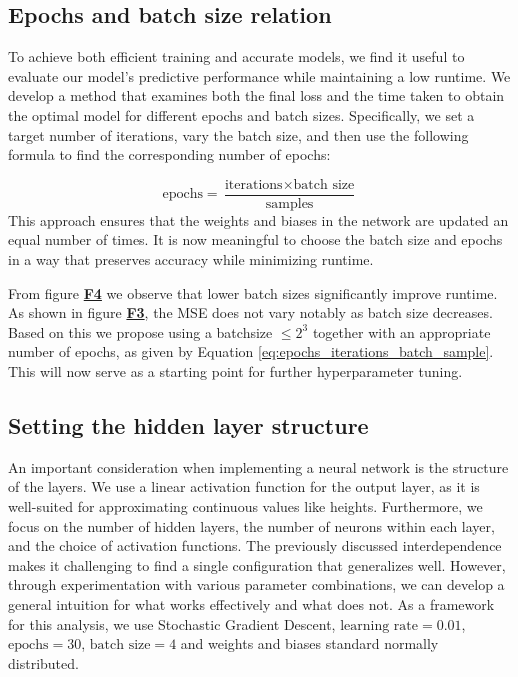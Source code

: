 \documentclass{article}
\begin{document}
\begin{multicols}{2}
\subsection*{Epochs and batch size relation}
To achieve both efficient training and accurate models, we find it useful to evaluate our model's predictive performance while maintaining a low runtime. We develop a method that examines both the final loss and the time taken to obtain the optimal model for different epochs and batch sizes. Specifically, we set a target number of iterations, vary the batch size, and then use the following formula to find the corresponding number of epochs:

\begin{equation} \label{eq:epochs_iterations_batch_sample}
    \text{epochs} = \frac{\text{iterations} \times \text{batch size}}{\text{samples}}
\end{equation}
This approach ensures that the weights and biases in the network are updated an equal number of times. It is now meaningful to choose the batch size and epochs in a way that preserves accuracy while minimizing runtime.

From figure \hyperref[fig:F4]{\textbf{F4}} we observe that lower batch sizes significantly improve runtime. As shown in figure \hyperref[fig:F3]{\textbf{F3}}, the MSE does not vary notably as batch size decreases. Based on this we propose using a batchsize $\leq 2^3$ together with an appropriate number of epochs, as given by Equation \ref{eq:epochs_iterations_batch_sample}. This will now serve as a starting point for further hyperparameter tuning.

\subsection*{Setting the hidden layer structure}
An important consideration when implementing a neural network is the structure of the layers. We use a linear activation function for the output layer, as it is well-suited for approximating continuous values like heights. Furthermore, we focus on the number of hidden layers, the number of neurons within each layer, and the choice of activation functions. 
The previously discussed interdependence makes it challenging to find a single configuration that generalizes well. However, through experimentation with various parameter combinations, we can develop a general intuition for what works effectively and what does not. As a framework for this analysis, we use Stochastic Gradient Descent, $\text{learning rate} = 0.01$, $\text{epochs} = 30$, $\text{batch size} = 4$ and weights and biases standard normally distributed. 


\end{multicols}
\end{document}
